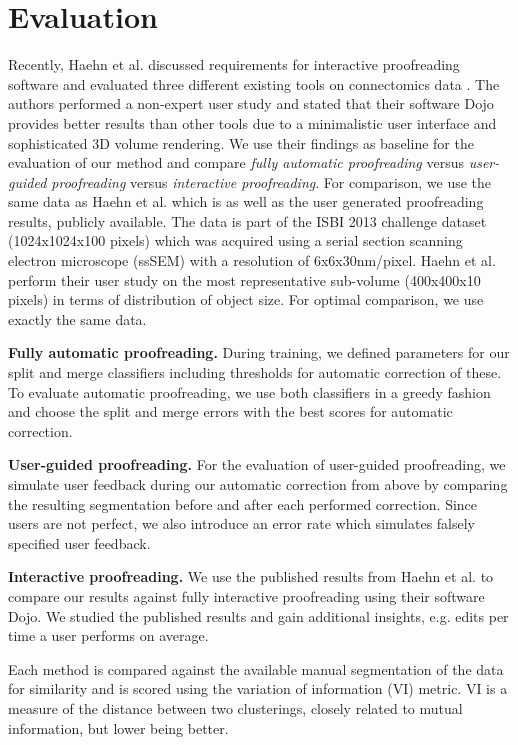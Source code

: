 \section{Evaluation}

Recently, Haehn et al. discussed requirements for interactive proofreading software and evaluated three different existing tools on connectomics data \cite{haehn_dojo_2014}. The authors performed a non-expert user study and stated that their software Dojo provides better results than other tools due to a minimalistic user interface and sophisticated 3D volume rendering. We use their findings as baseline for the evaluation of our method and compare \textit{fully automatic proofreading} versus \textit{user-guided proofreading} versus \textit{interactive proofreading}. For comparison, we use the same data as Haehn et al. which is as well as the user generated proofreading results, publicly available. The data is part of the ISBI 2013 challenge dataset (1024x1024x100 pixels) which was acquired using a serial section scanning electron microscope (ssSEM) with a resolution of 6x6x30nm/pixel. Haehn et al. perform their user study on the most representative sub-volume (400x400x10 pixels) in terms of distribution of object size. For optimal comparison, we use exactly the same data.

\textbf{Fully automatic proofreading.} During training, we defined parameters for our split and merge classifiers including thresholds for automatic correction of these. To evaluate automatic proofreading, we use both classifiers in a greedy fashion and choose the split and merge errors with the best scores for automatic correction.

\textbf{User-guided proofreading.} For the evaluation of user-guided proofreading, we simulate user feedback during our automatic correction from above by comparing the resulting segmentation before and after each performed correction. Since users are not perfect, we also introduce an error rate which simulates falsely specified user feedback.

\textbf{Interactive proofreading.} We use the published results from Haehn et al. to compare our results against fully interactive proofreading using their software Dojo. We studied the published results and gain additional insights, e.g. edits per time a user performs on average.

Each method is compared against the available manual segmentation of the data for similarity and is scored using the variation of information (VI) metric. VI is a measure of the distance between two clusterings, closely related to mutual information, but lower being better.







